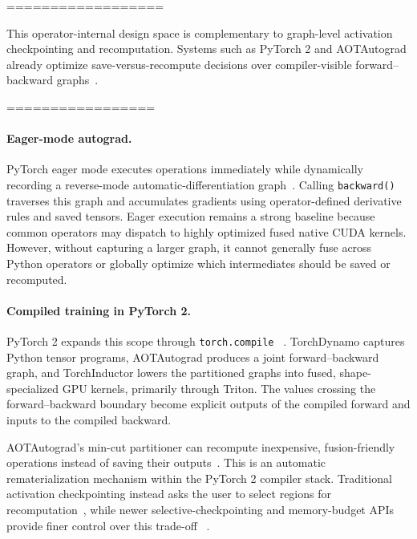 ================== 

This operator-internal design space is complementary to graph-level activation checkpointing and recomputation. Systems such as PyTorch 2 and AOTAutograd already optimize save-versus-recompute decisions over compiler-visible forward--backward graphs~\cite{ansel2024pytorch2,pytorch2025activationcheckpointing}. 

=================

\paragraph{Eager-mode autograd.}
PyTorch eager mode executes operations immediately while dynamically recording
a reverse-mode automatic-differentiation graph~\cite{paszke2019pytorch}.
Calling \texttt{backward()} traverses this graph and accumulates gradients using
operator-defined derivative rules and saved tensors. Eager execution remains a
strong baseline because common operators may dispatch to highly optimized fused native CUDA kernels. However, without capturing a larger graph, it cannot generally
fuse across Python operators or globally optimize which intermediates should be
saved or recomputed.

\paragraph{Compiled training in PyTorch 2.}
PyTorch 2 expands this scope through \texttt{torch.compile}
~\cite{ansel2024pytorch2}. TorchDynamo captures Python tensor programs,
AOTAutograd produces a joint forward--backward graph, and TorchInductor lowers
the partitioned graphs into fused, shape-specialized GPU kernels, primarily
through Triton. The values crossing the forward--backward boundary become
explicit outputs of the compiled forward and inputs to the compiled backward.

AOTAutograd's min-cut partitioner can recompute inexpensive, fusion-friendly
operations instead of saving their outputs~\cite{he2023fusionaware}. This is an
automatic rematerialization mechanism within the PyTorch 2 compiler stack.
Traditional activation checkpointing instead asks the user to select regions
for recomputation~\cite{chen2016sublinear}, while newer selective-checkpointing
and memory-budget APIs provide finer control over this trade-off
~\cite{pytorch2025activationcheckpointing}.

